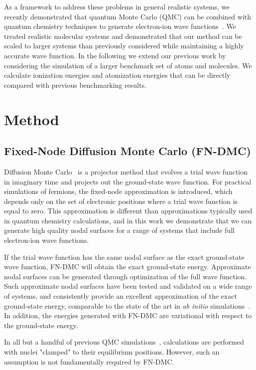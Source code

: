 \documentclass[pra,superscriptaddress,groupedaddress,twocolumn]{revtex4}
\begin{document}
As a framework to address these problems in general realistic systems, we recently demonstrated that quantum Monte Carlo (QMC) can be combined with quantum chemistry techniques to generate electron-ion wave functions~\cite{Tubman_ECG}. We treated realistic molecular systems and demonstrated that our method can be scaled to larger systems than previously considered while maintaining a highly accurate wave function. In the following we extend our previous work by considering the simulation of a larger benchmark set of atoms and molecules.  We calculate ionization energies and atomization energies that can be directly compared with previous benchmarking results.

\section{Method}
\subsection{Fixed-Node Diffusion Monte Carlo (FN-DMC)}
Diffusion Monte Carlo~\cite{Anderson_DMC,lester1,Stuart_Review,Needs_Review,Needs_Old_Review,QMC_Review} is a projector method that evolves a trial wave function in imaginary time and projects out the ground-state wave function. For practical simulations of fermions, the fixed-node approximation is introduced, which depends only on the set of electronic positions where a trial wave function is equal to zero.  This approximation is different than approximations typically used in quantum chemistry calculations, and in this work we demonstrate that we can generate high quality nodal surfaces for a range of systems that include full electron-ion wave functions. 

If the trial wave function has the same nodal surface as the exact ground-state wave function, FN-DMC will obtain the exact ground-state energy.  Approximate nodal surfaces can be generated through optimization of the full wave function. Such approximate nodal surfaces have been tested and validated on a wide range of systems, and consistently provide an excellent approximation of the exact ground-state energy, comparable to the state of the art in \textit{ab initio} simulations~\cite{grossman1}. In addition, the energies generated with FN-DMC are variational with respect to the ground-state energy.

In all but a handful of previous QMC simulations~\cite{Ceperley_1987,Natoli_1993,Natoli_1995,Chen_1995,Coldwell_H2_2008,Gabriele_H2_2004,Sandro_finiteT-noBO_2012}, calculations are performed with nuclei "clamped" to their equilibrium positions. However, such an assumption is not fundamentally required by FN-DMC. %
\end{document}
